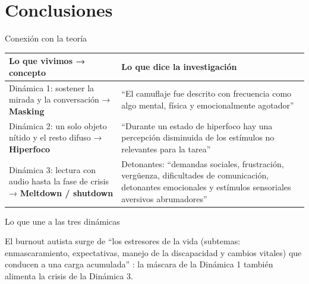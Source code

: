 \section{Conclusiones}

\begin{frame}{Conexión con la teoría}
  \begingroup\footnotesize
  \renewcommand{\arraystretch}{1.1}
  \begin{tabularx}{\textwidth}{@{}p{}X@{}}
    \toprule
    \textbf{Lo que vivimos → concepto} & \textbf{Lo que dice la investigación} \tabularnewline
    \midrule
    \raggedright Dinámica 1: sostener la mirada y la conversación
    → \textbf{Masking}
      & \raggedright\enquote{El camuflaje fue descrito con frecuencia como algo mental, física y emocionalmente agotador} \citep{hull2017} \tabularnewline
    \raggedright Dinámica 2: un solo objeto nítido y el resto difuso
    → \textbf{Hiperfoco}
      & \raggedright\enquote{Durante un estado de hiperfoco hay una percepción disminuida de los estímulos no relevantes para la tarea} \citep{ashinoff2021} \tabularnewline
    \raggedright Dinámica 3: lectura con audio hasta la fase de crisis
    → \textbf{Meltdown / shutdown}
      & \raggedright Detonantes: \enquote{demandas sociales, frustración, vergüenza, dificultades de comunicación, detonantes emocionales y estímulos sensoriales aversivos abrumadores} \citep{phung2021} \tabularnewline
    \bottomrule
  \end{tabularx}
  \par\endgroup

  \begin{block}{Lo que une a las tres dinámicas}
    {\footnotesize
    El burnout autista surge de \enquote{los estresores de la vida (subtemas:
    enmascaramiento, expectativas, manejo de la discapacidad y cambios vitales)
    que conducen a una carga acumulada} \citep{raymaker2020}: la máscara de la
    Dinámica 1 también alimenta la crisis de la Dinámica 3.\par}
  \end{block}
\end{frame}

